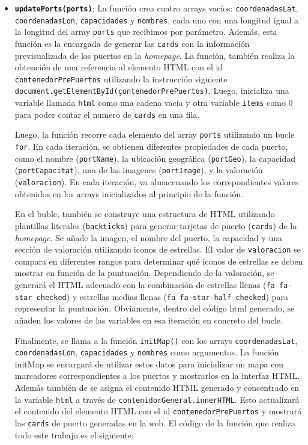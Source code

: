 \documentclass{article}
\begin{document}
\begin{itemize}
    \item \textbf{\texttt{updatePorts(ports)}}: La función crea cuatro arrays vacíos: \texttt{coordenadasLat}, \texttt{coordenadasLon}, \texttt{capacidades} y \texttt{nombres}, cada uno con una longitud igual a la longitud del array \texttt{ports} que recibimos por parámetro. Además, esta función es la encargada de generar las \texttt{cards} con la información previsualizada de los puertos en la \textit{homepage}. La función, también realiza la obtención de una referencia al elemento HTML con el id \texttt{contenedorPrePuertos} utilizando la instrucción siguiente \texttt{document.getElementById(çontenedorPrePuertos)}. Luego, inicializa una variable llamada \texttt{html} como una cadena vacía y otra variable \texttt{items} como 0 para poder contar el numero de \texttt{cards} en una fila.
    
    Luego, la función recorre cada elemento del array \texttt{ports} utilizando un bucle \texttt{for}. En cada iteración,  se obtienen diferentes propiedades de cada puerto, como el nombre (\texttt{portName}), la ubicación geográfica (\texttt{portGeo}), la capacidad (\texttt{portCapacitat}), una de las imagenes (\texttt{portImage}), y la valoración (\texttt{valoracion}). En cada iteración, va almacenando los correpondientes valores obtenidos en los arrays inicializados al principio de la función.
    
    En el buble, también se construye una estructura de HTML utilizando plantillas literales (\texttt{backticks}) para generar tarjetas de puerto (\texttt{cards}) de la \textit{homepage}. Se añade la imagen, el nombre del puerto, la capacidad y una sección de valoración utilizando iconos de estrellas. El valor de \texttt{valoracion} se compara en diferentes rangos para determinar qué iconos de estrellas se deben mostrar en función de la puntuación. Dependiendo de la valoración, se generará el HTML adecuado con la combinación de estrellas llenas (\texttt{fa fa-star checked}) y estrellas medias llenas (\texttt{fa fa-star-half checked}) para representar la puntuación. Obviamente, dentro del código html generado, se añaden los valores de las variables en esa iteración en concreto del bucle.
    
    Finalmente, se llama a la función \texttt{initMap()} con los arrays \texttt{coordenadasLat}, \texttt{coordenadasLon}, \texttt{capacidades} y \texttt{nombres} como argumentos. La función initMap se encargará de utilizar estos datos para inicializar un mapa con marcadores correspondientes a los puertos y mostrarlos en la interfaz HTML. Además también de se asigna el contenido HTML generado y concentrado en la variable \texttt{html} a través de \texttt{contenidorGeneral.innerHTML}. Esto actualizará el contenido del elemento HTML con el id \texttt{contenedorPrePuertos} y mostrará las \texttt{cards} de puerto generadas en la web. El código de la función que realiza todo este trabajo es el siguiente:


\end{itemize}
\end{document}
